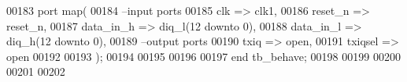 \begin{DoxyCode}
00183     \textcolor{keywordflow}{port} \textcolor{keywordflow}{map}(
00184 \textcolor{keyword}{      --input ports }
00185       clk           => clk1,
00186       reset_n       => reset_n, 
00187           data_in_h  => diq_l\textcolor{vhdlchar}{(}\textcolor{vhdllogic}{12} \textcolor{keywordflow}{downto} \textcolor{vhdllogic}{0}\textcolor{vhdlchar}{)},
00188           data_in_l  => diq_h\textcolor{vhdlchar}{(}\textcolor{vhdllogic}{12} \textcolor{keywordflow}{downto} \textcolor{vhdllogic}{0}\textcolor{vhdlchar}{)},
00189 \textcolor{keyword}{        --output ports }
00190           txiq             => \textcolor{keywordflow}{open}, 
00191           txiqsel        => \textcolor{keywordflow}{open} 
00192         
00193         \textcolor{vhdlchar}{)};
00194         
00195         
00196     
00197     \textcolor{keywordflow}{end} \textcolor{vhdlchar}{tb\_behave};
00198   
00199   
00200 
00201 
00202   
\end{DoxyCode}
